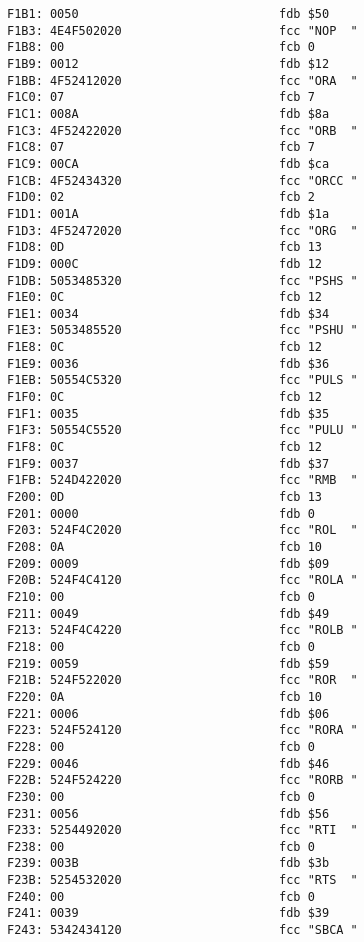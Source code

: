 {\begin{verbatim}
F1B1: 0050                            fdb $50
F1B3: 4E4F502020                      fcc "NOP  "
F1B8: 00                              fcb 0
F1B9: 0012                            fdb $12
F1BB: 4F52412020                      fcc "ORA  "
F1C0: 07                              fcb 7
F1C1: 008A                            fdb $8a
F1C3: 4F52422020                      fcc "ORB  "
F1C8: 07                              fcb 7
F1C9: 00CA                            fdb $ca
F1CB: 4F52434320                      fcc "ORCC "
F1D0: 02                              fcb 2
F1D1: 001A                            fdb $1a
F1D3: 4F52472020                      fcc "ORG  "
F1D8: 0D                              fcb 13
F1D9: 000C                            fdb 12
F1DB: 5053485320                      fcc "PSHS "
F1E0: 0C                              fcb 12
F1E1: 0034                            fdb $34
F1E3: 5053485520                      fcc "PSHU "
F1E8: 0C                              fcb 12
F1E9: 0036                            fdb $36
F1EB: 50554C5320                      fcc "PULS "
F1F0: 0C                              fcb 12
F1F1: 0035                            fdb $35
F1F3: 50554C5520                      fcc "PULU "
F1F8: 0C                              fcb 12
F1F9: 0037                            fdb $37
F1FB: 524D422020                      fcc "RMB  "
F200: 0D                              fcb 13
F201: 0000                            fdb 0
F203: 524F4C2020                      fcc "ROL  "
F208: 0A                              fcb 10
F209: 0009                            fdb $09
F20B: 524F4C4120                      fcc "ROLA "
F210: 00                              fcb 0
F211: 0049                            fdb $49
F213: 524F4C4220                      fcc "ROLB "
F218: 00                              fcb 0
F219: 0059                            fdb $59
F21B: 524F522020                      fcc "ROR  "
F220: 0A                              fcb 10
F221: 0006                            fdb $06
F223: 524F524120                      fcc "RORA "
F228: 00                              fcb 0
F229: 0046                            fdb $46
F22B: 524F524220                      fcc "RORB "
F230: 00                              fcb 0
F231: 0056                            fdb $56
F233: 5254492020                      fcc "RTI  "
F238: 00                              fcb 0
F239: 003B                            fdb $3b
F23B: 5254532020                      fcc "RTS  "
F240: 00                              fcb 0
F241: 0039                            fdb $39
F243: 5342434120                      fcc "SBCA "

\end{verbatim}}
